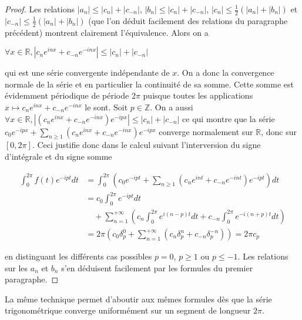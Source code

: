 \begin{proof}
Les relations
$|a_n| \leq |c_n| + |c_{-n}|$, 
$|b_n| \leq |c_n| + |c_{-n}|$,
$|c_n| \leq \frac{1}{2} (|a_n| + |b_n|)$ et
$|c_{-n}| \leq \frac{1}{2} (|a_n| + |b_n|)$
(que l'on déduit facilement des relations du paragraphe précédent)
montrent clairement l'équivalence. Alors on a

$\forall x \in \mathbb{R}, |c_n e^{inx} + c_{-n} e^{-inx}| \leq |c_n| + |c_{-n}|$

qui est une série convergente indépendante de $x$. On a donc la
convergence normale de la série et en particulier la continuité de sa
somme. Cette somme est évidemment périodique de période $2\pi$ puisque
toutes les applications
$x \mapsto c_n e^{inx} + c_{-n} e^{-inx}$ le sont. Soit $p \in \mathbb{Z}$. On a aussi
$\forall x \in \mathbb{R},
|(c_n e^{inx} + c_{-n} e^{-inx}) e^{-ipx}| \leq |c_n| + |c_{-n}|$ ce qui montre que la série
$c_0 e^{-ipx} + \sum_{n \geq 1} (c_n e^{inx} + c_{-n} e^{-inx}) e^{-ipx}$ converge normalement
sur $\mathbb{R}$, donc sur $[0,2\pi]$. Ceci justifie donc dans le calcul suivant
l'interversion du signe d'intégrale et du signe somme

\begin{align*} 
\int_0^{2\pi} f(t) e^{-ipt} dt 
&= \int_0^{2\pi} \left(c_0 e^{-ipt} + \sum_{n \geq 1} (c_n e^{int} + c_{-n} e^{-int}) e^{-ipt} \right) dt \\
&= c_0 \int_0^{2\pi} e^{-ipt} dt \\
&\quad + \sum_{n=1}^{+\infty} \left(c_n \int_0^{2\pi} e^{i(n-p)t} dt + c_{-n} \int_0^{2\pi} e^{-i(n+p)t} dt \right) \\
&= 2\pi \left(c_0 \delta_p^0 + \sum_{n=1}^{+\infty} (c_n \delta_p^n + c_{-n} \delta_p^{-n}) \right) = 2\pi c_p
\end{align*}

en distinguant les différents cas possibles $p = 0$, $p \geq 1$ ou $p \leq -1$. Les
relations sur les $a_n$ et $b_n$ s'en déduisent facilement
par les formules du premier paragraphe.  
\end{proof}

\begin{rem}
La même technique permet d'aboutir aux mêmes formules
dès que la série trigonométrique converge uniformément sur un segment de
longueur $2\pi$.
\end{rem}